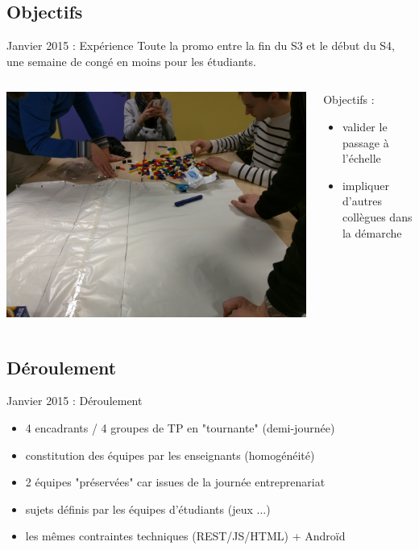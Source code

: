 \documentclass{beamer}
\begin{document}
\subsection{Objectifs}
\begin{frame}{Janvier 2015 : Expérience}
  Toute la promo entre la fin du S3 et le début du S4, une semaine de congé en moins pour les étudiants.
  \begin{columns}
    \begin{column}{0.5\textwidth}
      \begin{center}
        \includegraphics[width=\textwidth]{includes/201501_lego.jpg}      
      \end{center}
    \end{column}
    \begin{column}{0.5\textwidth}
      Objectifs : 
      \begin{itemize}
        \item valider le passage à l'échelle
        \item impliquer d'autres collègues dans la démarche
      \end{itemize}
    \end{column}
  \end{columns}
\end{frame}

\subsection{Déroulement}
\begin{frame}{Janvier 2015 : Déroulement}
  \begin{itemize}
    \item 4 encadrants / 4 groupes de TP en "tournante" (demi-journée)
    \item constitution des équipes par les enseignants (homogénéité)
    \item 2 équipes "préservées" car issues de la journée entreprenariat 
    \item sujets définis par les équipes d'étudiants (jeux ...)
    \item les mêmes contraintes techniques (REST/JS/HTML) + Androïd
  \end{itemize}
\end{frame}
\end{document}
